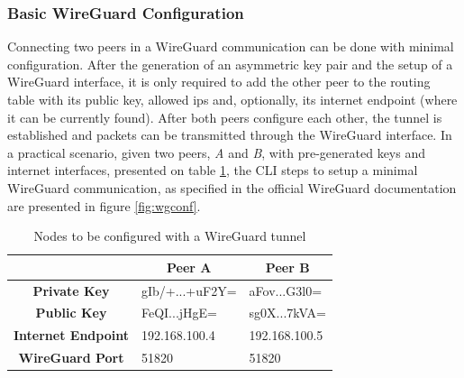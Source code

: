 \documentclass[11pt,twoside,a4paper]{report}
\begin{document}
\subsubsection{Basic WireGuard Configuration}

Connecting two peers in a WireGuard communication can be done with minimal configuration. After the generation of an asymmetric key pair and the setup of a WireGuard interface, it is only required to add the other peer to the routing table with its public key, allowed \ac{ip}s and, optionally, its internet endpoint (where it can be currently found). After both peers configure each other, the tunnel is established and packets can be transmitted through the WireGuard interface.
In a practical scenario, given two peers, \emph{A} and \emph{B}, with pre-generated keys and internet interfaces, presented on table \ref{tab:wgconfpeers}, the CLI steps to setup a minimal WireGuard communication, as specified in the official WireGuard documentation are presented in figure \ref{fig:wgconf}.


\begin{table}[]
\centering
\begin{tabular}{c|l|l|}
\cline{2-3}
\multicolumn{1}{l|}{}                            & \multicolumn{1}{c|}{\textbf{Peer A}} & \multicolumn{1}{c|}{\textbf{Peer B}} \\ \hline
\multicolumn{1}{|c|}{\textbf{Private Key}}       & gIb/+...+uF2Y=                       & aFov...G3l0=                         \\ \hline
\multicolumn{1}{|c|}{\textbf{Public Key}}        & FeQI...jHgE=                         & sg0X...7kVA=                         \\ \hline
\multicolumn{1}{|c|}{\textbf{Internet Endpoint}} & 192.168.100.4                        & 192.168.100.5                        \\ \hline
\multicolumn{1}{|c|}{\textbf{WireGuard Port}}    & 51820                                & 51820                                \\ \hline
\end{tabular}
\caption{Nodes to be configured with a WireGuard tunnel}
\label{tab:wgconfpeers}
\end{table}
\end{document}
